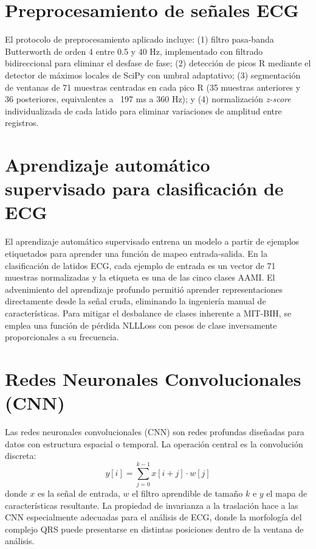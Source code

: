 \documentclass[11pt,spanish]{citedi}
\begin{document}
\section{Preprocesamiento de señales ECG}

El protocolo de preprocesamiento aplicado incluye: (1) filtro pasa-banda Butterworth de orden 4 entre 0.5 y 40 Hz, implementado con filtrado bidireccional para eliminar el desfase de fase; (2) detección de picos R mediante el detector de máximos locales de SciPy con umbral adaptativo; (3) segmentación de ventanas de 71 muestras centradas en cada pico R (35 muestras anteriores y 36 posteriores, equivalentes a ~197 ms a 360 Hz); y (4) normalización \textit{z-score} individualizada de cada latido para eliminar variaciones de amplitud entre registros.

\section{Aprendizaje automático supervisado para clasificación de ECG}

El aprendizaje automático supervisado entrena un modelo a partir de ejemplos etiquetados para aprender una función de mapeo entrada-salida. En la clasificación de latidos ECG, cada ejemplo de entrada es un vector de 71 muestras normalizadas y la etiqueta es una de las cinco clases AAMI. El advenimiento del aprendizaje profundo permitió aprender representaciones directamente desde la señal cruda, eliminando la ingeniería manual de características. Para mitigar el desbalance de clases inherente a MIT-BIH, se emplea una función de pérdida NLLLoss con pesos de clase inversamente proporcionales a su frecuencia.

\section{Redes Neuronales Convolucionales (CNN)}

Las redes neuronales convolucionales (CNN) son redes profundas diseñadas para datos con estructura espacial o temporal. La operación central es la convolución discreta:
\begin{equation}
y[i] = \sum_{j=0}^{k-1} x[i+j] \cdot w[j]
\end{equation}
donde $x$ es la señal de entrada, $w$ el filtro aprendible de tamaño $k$ e $y$ el mapa de características resultante. La propiedad de invarianza a la traslación hace a las CNN especialmente adecuadas para el análisis de ECG, donde la morfología del complejo QRS puede presentarse en distintas posiciones dentro de la ventana de análisis.
\end{document}
